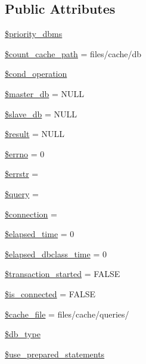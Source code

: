 \subsection*{Public Attributes}
\begin{DoxyCompactItemize}
\item 
\hyperlink{classDB_a082292b9ca3855cbddd3a74e9490ca82}{\$priority\+\_\+dbms}
\item 
\hyperlink{classDB_aca72b9b3a39bb5e5d2e444f20db2c6bb}{\$count\+\_\+cache\+\_\+path} = \textquotesingle{}files/cache/db\textquotesingle{}
\item 
\hyperlink{classDB_a85f8f65c37474b0e65d844e1f01f39b0}{\$cond\+\_\+operation}
\item 
\hyperlink{classDB_ad0a3ae175a659516131cfc6cd615d15c}{\$master\+\_\+db} = N\+U\+LL
\item 
\hyperlink{classDB_a0a811a4446882ee9edf0ed846e8926f3}{\$slave\+\_\+db} = N\+U\+LL
\item 
\hyperlink{classDB_a74e74ee9d3311aa1e8107b8accd05e29}{\$result} = N\+U\+LL
\item 
\hyperlink{classDB_af99d759f7fb3bbadd579d72e686d1cf1}{\$errno} = 0
\item 
\hyperlink{classDB_ae006f35821aba99713b834fa6a69e55b}{\$errstr} = \textquotesingle{}\textquotesingle{}
\item 
\hyperlink{classDB_a32ebabea908efd805a83db48fec3ab52}{\$query} = \textquotesingle{}\textquotesingle{}
\item 
\hyperlink{classDB_ac9071e31f8241ad644430537f39a16ce}{\$connection} = \textquotesingle{}\textquotesingle{}
\item 
\hyperlink{classDB_af5a3fdd4e0078a185dac8c2727fb4f2c}{\$elapsed\+\_\+time} = 0
\item 
\hyperlink{classDB_a0483c1bfe18fa5e8bbe7915f9c8187a7}{\$elapsed\+\_\+dbclass\+\_\+time} = 0
\item 
\hyperlink{classDB_a39a0eef56f82082ca4c69bcad1f12a31}{\$transaction\+\_\+started} = F\+A\+L\+SE
\item 
\hyperlink{classDB_aac22b6ebcd8f78c2f70646d381f933dc}{\$is\+\_\+connected} = F\+A\+L\+SE
\item 
\hyperlink{classDB_a9952a27cbf07942e5bb8853ab95b5bdb}{\$cache\+\_\+file} = \textquotesingle{}files/cache/queries/\textquotesingle{}
\item 
\hyperlink{classDB_a78868b4c2301aa813d9e2d481424f1e8}{\$db\+\_\+type}
\item 
\hyperlink{classDB_a9902aee7d8900a597670fce92c7eb74b}{\$use\+\_\+prepared\+\_\+statements}
\end{DoxyCompactItemize}
